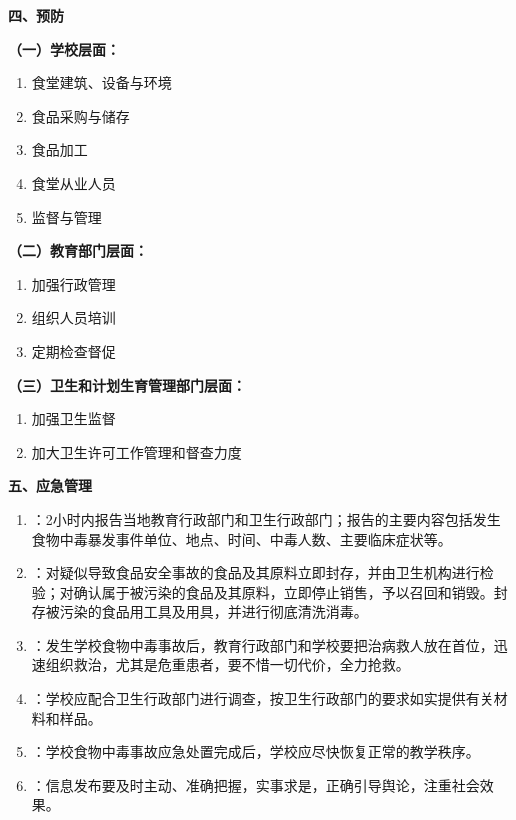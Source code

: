 \begin{keybox}
\textbf{四、预防}

\textbf{（一）学校层面：}
\begin{enumerate}[leftmargin=*]
    \item 食堂建筑、设备与环境
    \item 食品采购与储存
    \item 食品加工
    \item 食堂从业人员
    \item 监督与管理
\end{enumerate}

\textbf{（二）教育部门层面：}
\begin{enumerate}[leftmargin=*]
    \item 加强行政管理
    \item 组织人员培训
    \item 定期检查督促
\end{enumerate}

\textbf{（三）卫生和计划生育管理部门层面：}
\begin{enumerate}[leftmargin=*]
    \item 加强卫生监督
    \item 加大卫生许可工作管理和督查力度
\end{enumerate}

\textbf{五、应急管理}

\begin{enumerate}[leftmargin=*]
    \item {}：2小时内报告当地教育行政部门和卫生行政部门；报告的主要内容包括发生食物中毒暴发事件单位、地点、时间、中毒人数、主要临床症状等。
    \item {}：对疑似导致食品安全事故的食品及其原料立即封存，并由卫生机构进行检验；对确认属于被污染的食品及其原料，立即停止销售，予以召回和销毁。封存被污染的食品用工具及用具，并进行彻底清洗消毒。
    \item {}：发生学校食物中毒事故后，教育行政部门和学校要把治病救人放在首位，迅速组织救治，尤其是危重患者，要不惜一切代价，全力抢救。
    \item {}：学校应配合卫生行政部门进行调查，按卫生行政部门的要求如实提供有关材料和样品。
    \item {}：学校食物中毒事故应急处置完成后，学校应尽快恢复正常的教学秩序。
    \item {}：信息发布要及时主动、准确把握，实事求是，正确引导舆论，注重社会效果。
\end{enumerate}
\end{keybox}

